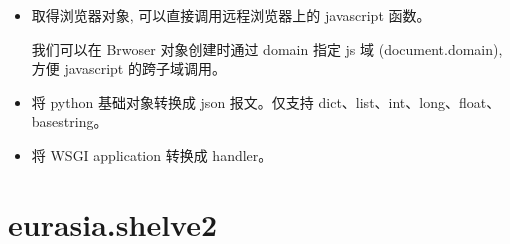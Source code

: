 \documentclass{manual}
\begin{document}
\begin{itemize}
\item {}

取得浏览器对象, 可以直接调用远程浏览器上的 javascript 函数。

我们可以在 Brwoser 对象创建时通过 domain 指定 js 域 (document.domain),
方便 javascript 的跨子域调用。


\item {}

将 python 基础对象转换成 json 报文。仅支持 dict、list、int、long、float、basestring。


\item {}

将 WSGI application 转换成 handler。

\end{itemize}

\section{eurasia.shelve2}
\end{document}
